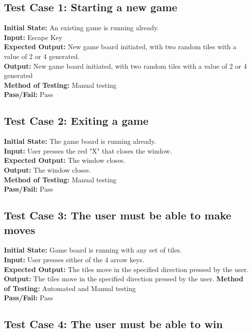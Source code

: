 \documentclass[12pt]{article}
\begin{document}
\subsection{Test Case 1: Starting a new game}

\textbf{Initial State:} An existing game is running already. \\
\textbf{Input:} Escape Key\\
\textbf{Expected Output:} New game board initiated, with two random tiles with a value of 2 or 4 generated. \\
\textbf{Output:} New game board initiated, with two random tiles with a value of 2 or 4 generated \\
\textbf{Method of Testing:} Manual testing\\
\textbf{Pass/Fail:} Pass

\subsection{Test Case 2: Exiting a game}

\textbf{Initial State:} The game board is running already.\\
\textbf{Input:} User presses the red "X" that closes the window.\\
\textbf{Expected Output:} The window closes.\\
\textbf{Output:} The window closes. \\
\textbf{Method of Testing:} Manual testing\\
\textbf{Pass/Fail:} Pass

\subsection{Test Case 3: The user must be able to make moves}

\textbf{Initial State:} Game board is running with any set of tiles.\\
\textbf{Input:} User presses either of the 4 arrow keys.\\
\textbf{Expected Output:} The tiles move in the specified direction pressed by the user.\\
\textbf{Output:} The tiles move in the specified direction pressed by the user.
\textbf{Method of Testing:} Automated and Manual testing\\
\textbf{Pass/Fail:} Pass

\subsection{Test Case 4: The user must be able to win}
\end{document}
